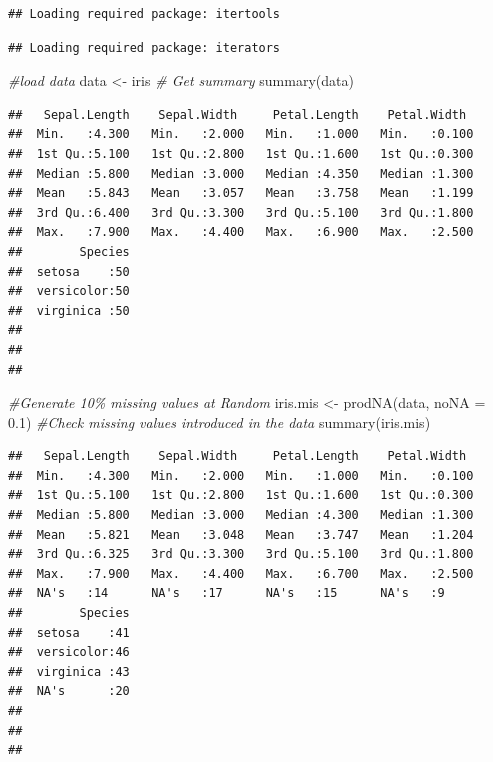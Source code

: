 \documentclass[
]{book}
\newenvironment{Shaded}{\begin{snugshade}}{\end{snugshade}}
\newcommand{\AttributeTok}[1]{\textcolor[rgb]{0.77,0.63,0.00}{#1}}
\newcommand{\CommentTok}[1]{\textcolor[rgb]{0.56,0.35,0.01}{\textit{#1}}}
\newcommand{\FloatTok}[1]{\textcolor[rgb]{0.00,0.00,0.81}{#1}}
\newcommand{\FunctionTok}[1]{\textcolor[rgb]{0.00,0.00,0.00}{#1}}
\newcommand{\NormalTok}[1]{#1}
\newcommand{\OtherTok}[1]{\textcolor[rgb]{0.56,0.35,0.01}{#1}}
\begin{document}
\begin{verbatim}
## Loading required package: itertools
\end{verbatim}

\begin{verbatim}
## Loading required package: iterators
\end{verbatim}

\begin{Shaded}
\begin{Highlighting}[]
\CommentTok{\#load data}
\NormalTok{data }\OtherTok{\textless{}{-}}\NormalTok{ iris }
\CommentTok{\# Get summary}
\FunctionTok{summary}\NormalTok{(data)}
\end{Highlighting}
\end{Shaded}

\begin{verbatim}
##   Sepal.Length    Sepal.Width     Petal.Length    Petal.Width   
##  Min.   :4.300   Min.   :2.000   Min.   :1.000   Min.   :0.100  
##  1st Qu.:5.100   1st Qu.:2.800   1st Qu.:1.600   1st Qu.:0.300  
##  Median :5.800   Median :3.000   Median :4.350   Median :1.300  
##  Mean   :5.843   Mean   :3.057   Mean   :3.758   Mean   :1.199  
##  3rd Qu.:6.400   3rd Qu.:3.300   3rd Qu.:5.100   3rd Qu.:1.800  
##  Max.   :7.900   Max.   :4.400   Max.   :6.900   Max.   :2.500  
##        Species  
##  setosa    :50  
##  versicolor:50  
##  virginica :50  
##                 
##                 
## 
\end{verbatim}

\begin{Shaded}
\begin{Highlighting}[]
\CommentTok{\#Generate 10\% missing values at Random}
\NormalTok{iris.mis }\OtherTok{\textless{}{-}} \FunctionTok{prodNA}\NormalTok{(data, }\AttributeTok{noNA =} \FloatTok{0.1}\NormalTok{)}
\CommentTok{\#Check missing values introduced in the data}
\FunctionTok{summary}\NormalTok{(iris.mis)}
\end{Highlighting}
\end{Shaded}

\begin{verbatim}
##   Sepal.Length    Sepal.Width     Petal.Length    Petal.Width   
##  Min.   :4.300   Min.   :2.000   Min.   :1.000   Min.   :0.100  
##  1st Qu.:5.100   1st Qu.:2.800   1st Qu.:1.600   1st Qu.:0.300  
##  Median :5.800   Median :3.000   Median :4.300   Median :1.300  
##  Mean   :5.821   Mean   :3.048   Mean   :3.747   Mean   :1.204  
##  3rd Qu.:6.325   3rd Qu.:3.300   3rd Qu.:5.100   3rd Qu.:1.800  
##  Max.   :7.900   Max.   :4.400   Max.   :6.700   Max.   :2.500  
##  NA's   :14      NA's   :17      NA's   :15      NA's   :9      
##        Species  
##  setosa    :41  
##  versicolor:46  
##  virginica :43  
##  NA's      :20  
##                 
##                 
## 
\end{verbatim}
\end{document}
